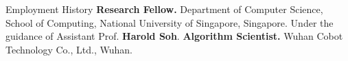 \begin{rubric}{Employment History}
%
	\textbf{Research Fellow.} Department of Computer Science, School of Computing, National University of Singapore, Singapore. Under the guidance of Assistant Prof. \textbf{Harold Soh}.  
%
%
\entry*[2018 -- 2019]%
	\textbf{Algorithm Scientist.} Wuhan Cobot Technology Co., Ltd., Wuhan.
%
\end{rubric}